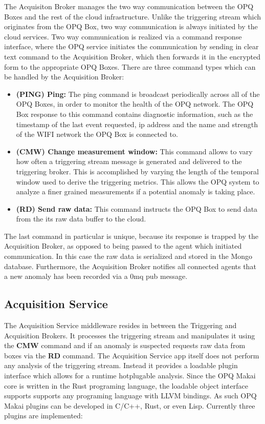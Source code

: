 The Acquisiton Broker manages the two way communication between the OPQ Boxes and the rest of the cloud infrastructure. Unlike the triggering stream which originates from the OPQ Box, two way communication is always initiated by the cloud services. Two way communication is realized via a command response interface, where the OPQ service initiates the communication by sending in clear text command to the Acquisition Broker, which then forwards it in the encrypted form to the appropriate OPQ Boxes. There are three command types which can be handled by the Acquisition Broker:
\begin{itemize}
\item{\textbf{(PING) Ping:}} The ping command is broadcast periodically across all of the OPQ Boxes, in order to monitor the health of the OPQ network. The OPQ Box response to this command contains diagnostic information, such as the timestamp of the last event requested, ip address and the name and strength of the WIFI network the OPQ Box is connected to.
\item{\textbf{(CMW) Change measurement window:}} This command allows to vary how often a triggering stream message is generated and delivered to the triggering broker. This is accomplished by varying the length of the temporal window used to derive the triggering metrics. This allows the OPQ system to analyze a finer grained measurements if a potential anomaly is taking place. 

\item{\textbf{(RD) Send raw data:}} This command instructs the OPQ Box to send data from the its raw data buffer to the cloud. 
\end{itemize}

The last command in particular is unique, because its response is trapped by the Acquisition Broker, as opposed to being passed to the agent which initiated communication. In this case the raw data is serialized and stored in the Mongo database. Furthermore, the Acquisition Broker notifies all connected agents that a new anomaly has been recorded via a 0mq pub message.

\subsection{Acquisition Service}

The Acquisition Service middleware resides in between the Triggering and Acquisition Brokers. It processes the triggering stream and manipulates it using the \textbf{CMW} command and if an anomaly is suspected requests raw data from boxes via the \textbf{RD} command. The Acquisition Service app itself does not perform any analysis of the triggering stream. Instead it provides a loadable plugin interface which allows for a runtime hotplugable analysis. Since the OPQ Makai core is written in the Rust programing language, the loadable object interface supports supports any programing language with LLVM bindings. As such OPQ Makai plugins can be developed in C/C++, Rust, or even Lisp. Currently three plugins are implemented:

